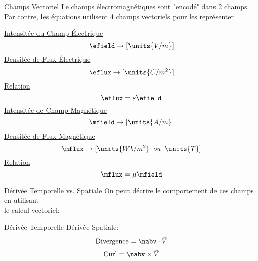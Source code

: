 \begin{frame}{Champs Vectoriel}
    \centering
    Le champs électromagnétiques sont "encodé" dans 2 champs. \\
    Par contre, les équations utilisent 4 champs vectoriels pour les représenter\\
    \vspace{15pt}
    \begin{twocolumns}[0.4]
        \leftcol
            \centering
            \underline{Intensitée du Champ Électrique}
            \begin{equation*}
                \efield \rightarrow [\units{V/m}]
            \end{equation*}
            \underline{Densitée de Flux Électrique}
            \begin{equation*}
                \eflux \rightarrow [\units{C/m^2}]
            \end{equation*}
            \underline{Relation}
            \begin{equation*}
                \eflux = \varepsilon \efield
            \end{equation*}
        \rightcol
            \centering
            \underline{Intensitée de Champ Magnétique}
            \begin{equation*}
                \mfield \rightarrow [\units{A/m}]
            \end{equation*}
            \underline{Densitée de Flux Magnétique}
            \begin{equation*}
                \mflux \rightarrow [\units{Wb/m^2} \;\; ou \;\; \units{T}]
            \end{equation*}
            \underline{Relation}
            \begin{equation*}
                \mflux = \mu \mfield
            \end{equation*}
    \end{twocolumns}
\end{frame}

\begin{frame}{Dérivée Temporelle vs. Spatiale}
    \centering
    On peut décrire le comportement de ces champs en utilisant\\
    le calcul vectoriel:
    \vspace{15pt}
    \begin{twocolumns}[0.5]
        \leftcol
            Dérivée Temporelle
        \rightcol
           Dérivée Spatiale:
            \begin{equation}
                \text{Divergence} = \nabv \cdot \vec{V}
            \end{equation}
            \begin{equation}
                \text{Curl} = \nabv \times \vec{V}
            \end{equation}
    \end{twocolumns}
\end{frame}

